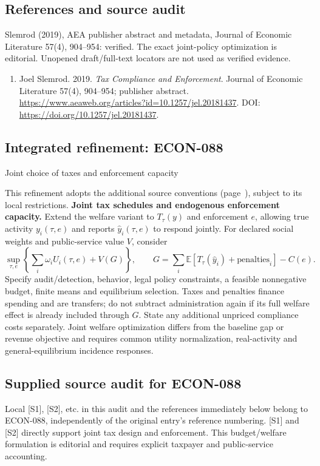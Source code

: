 \documentclass[11pt,a4paper]{article}
\begin{document}
\subsection*{References and source audit}
Slemrod (2019), AEA publisher abstract and metadata, Journal of Economic Literature 57(4), 904--954: verified. The exact joint-policy optimization is editorial. Unopened draft/full-text locators are not used as verified evidence.
\begin{enumerate}\raggedright
\item\hypertarget{definitions:source:30007759:1}{} Joel Slemrod. 2019. \emph{Tax Compliance and Enforcement}. Journal of Economic Literature 57(4), 904–954; publisher abstract.
\url{https://www.aeaweb.org/articles?id=10.1257/jel.20181437}.
DOI: \url{https://doi.org/10.1257/jel.20181437}.
\end{enumerate}

\subsection*{Integrated refinement: ECON-088}
{\sffamily\small\color{muted}Joint choice of taxes and enforcement capacity\par}
This refinement adopts the additional source conventions
(page~\pageref{audited:conventions}), subject to its local restrictions.
\textbf{Joint tax schedules and endogenous enforcement capacity.}
Extend the welfare variant to $T_\tau(y)$ and enforcement $e$, allowing true
activity $y_i(\tau,e)$ and reports $\widehat y_i(\tau,e)$ to respond jointly.
For declared social weights and public-service value $V$, consider
\[
\sup_{\tau,e}\left\{\sum_i\omega_iU_i(\tau,e)+V(G)\right\},\qquad
G=\sum_i\mathbb E[T_\tau(\widehat y_i)+\mathrm{penalties}_i]-C(e).
\]
Specify audit/detection, behavior, legal policy constraints, a feasible
nonnegative budget, finite means and equilibrium selection. Taxes and penalties
finance spending and are transfers; do not subtract administration again if its
full welfare effect is already included through $G$. State any additional
unpriced compliance costs separately. Joint welfare optimization differs from
the baseline gap or revenue objective and requires common utility normalization,
real-activity and general-equilibrium incidence responses.
\subsection*{Supplied source audit for ECON-088}
Local [S1], [S2], etc. in this audit and the references immediately below
belong to ECON-088, independently of the original entry's reference numbering.
[S1] and [S2] directly support joint tax design and enforcement. This budget/welfare formulation is editorial and requires explicit taxpayer and public-service accounting.
\end{document}
